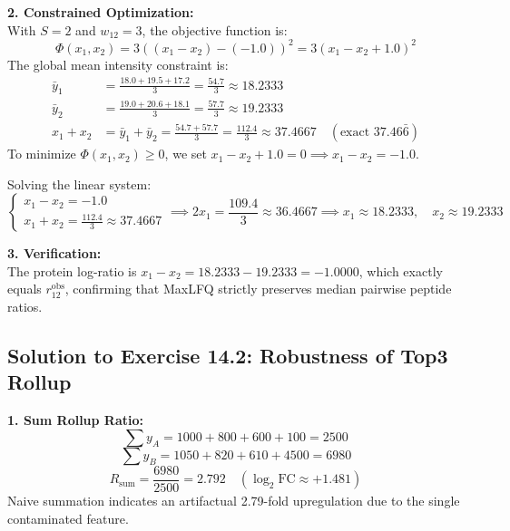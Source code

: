 \documentclass[11pt,oneside]{book}
\begin{document}
\textbf{2. Constrained Optimization:}\\
With $S = 2$ and $w_{12} = 3$, the objective function is:
$$\Phi(x_1, x_2) = 3 \left( (x_1 - x_2) - (-1.0) \right)^2 = 3 (x_1 - x_2 + 1.0)^2$$
The global mean intensity constraint is:
\begin{align*}
\bar{y}_1 &= \frac{18.0 + 19.5 + 17.2}{3} = \frac{54.7}{3} \approx 18.2333 \\
\bar{y}_2 &= \frac{19.0 + 20.6 + 18.1}{3} = \frac{57.7}{3} \approx 19.2333 \\
x_1 + x_2 &= \bar{y}_1 + \bar{y}_2 = \frac{54.7 + 57.7}{3} = \frac{112.4}{3} \approx 37.4667 \quad (\text{exact } 37.46\bar{6})
\end{align*}
To minimize $\Phi(x_1, x_2) \ge 0$, we set $x_1 - x_2 + 1.0 = 0 \implies x_1 - x_2 = -1.0$.

Solving the linear system:
$$\begin{cases}
x_1 - x_2 = -1.0 \\
x_1 + x_2 = \frac{112.4}{3} \approx 37.4667
\end{cases} \implies 2x_1 = \frac{109.4}{3} \approx 36.4667 \implies x_1 \approx 18.2333, \quad x_2 \approx 19.2333$$

\textbf{3. Verification:}\\
The protein log-ratio is $x_1 - x_2 = 18.2333 - 19.2333 = -1.0000$, which exactly equals $r_{12}^{\text{obs}}$, confirming that MaxLFQ strictly preserves median pairwise peptide ratios.

\subsection*{Solution to Exercise 14.2: Robustness of Top3 Rollup}
\textbf{1. Sum Rollup Ratio:}\\
$$\sum y_A = 1000 + 800 + 600 + 100 = 2500$$
$$\sum y_B = 1050 + 820 + 610 + 4500 = 6980$$
$$R_{\text{sum}} = \frac{6980}{2500} = 2.792 \quad (\log_2\text{FC} \approx +1.481)$$
Naive summation indicates an artifactual 2.79-fold upregulation due to the single contaminated feature.
\end{document}
